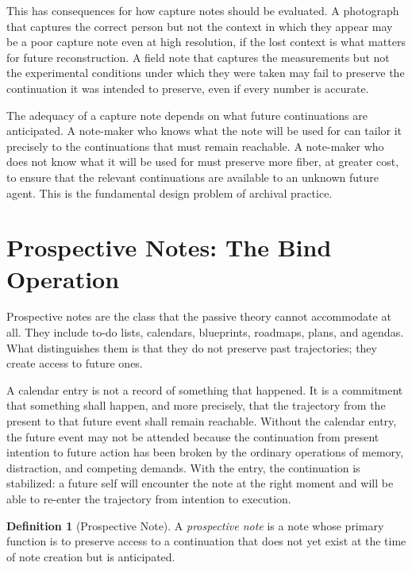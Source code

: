 \documentclass[12pt, a4paper]{article}
\theoremstyle{plain}
\theoremstyle{definition}
\newtheorem{definition}[theorem]{Definition}
\theoremstyle{remark}
\begin{document}
This has consequences for how capture notes should be evaluated. A photograph that
captures the correct person but not the context in which they appear may be a poor
capture note even at high resolution, if the lost context is what matters for
future reconstruction. A field note that captures the measurements but not the
experimental conditions under which they were taken may fail to preserve the
continuation it was intended to preserve, even if every number is accurate.

The adequacy of a capture note depends on what future continuations are
anticipated. A note-maker who knows what the note will be used for can tailor it
precisely to the continuations that must remain reachable. A note-maker who does
not know what it will be used for must preserve more fiber, at greater cost, to
ensure that the relevant continuations are available to an unknown future agent.
This is the fundamental design problem of archival practice.

\section{Prospective Notes: The Bind Operation}

Prospective notes are the class that the passive theory cannot accommodate at all.
They include to-do lists, calendars, blueprints, roadmaps, plans, and agendas.
What distinguishes them is that they do not preserve past trajectories; they
create access to future ones.

A calendar entry is not a record of something that happened. It is a commitment
that something shall happen, and more precisely, that the trajectory from the
present to that future event shall remain reachable. Without the calendar entry,
the future event may not be attended because the continuation from present intention
to future action has been broken by the ordinary operations of memory, distraction,
and competing demands. With the entry, the continuation is stabilized: a future
self will encounter the note at the right moment and will be able to re-enter the
trajectory from intention to execution.

\begin{definition}[Prospective Note]
A \emph{prospective note} is a note whose primary function is to preserve access
to a continuation that does not yet exist at the time of note creation but is
anticipated.
\end{definition}
\end{document}

